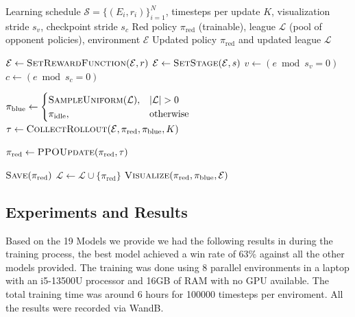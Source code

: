 \documentclass[conf]{new-aiaa}
\begin{document}
\begin{algorithm}[t]
\caption{League-based self-play training with curriculum over reward functions and spawn stages}
\label{alg:league_selfplay_curriculum}
\begin{algorithmic}[1]
\Require Learning schedule $\mathcal{S}=\{(E_i, r_i)\}_{i=1}^{N}$, timesteps per update $K$, visualization stride $s_v$, checkpoint stride $s_c$
\Require Red policy $\pi_{\text{red}}$ (trainable), league $\mathcal{L}$ (pool of opponent policies), environment $\mathcal{E}$
\Ensure Updated policy $\pi_{\text{red}}$ and updated league $\mathcal{L}$

 
    \State $\mathcal{E} \leftarrow \textsc{SetRewardFunction}(\mathcal{E}, r)$
     
        \State $\mathcal{E} \leftarrow \textsc{SetStage}(\mathcal{E}, s)$
            \State $v \gets (e \bmod s_v = 0)$ 
            \State $c \gets (e \bmod s_c = 0)$ 

            \State $\pi_{\text{blue}} \gets 
            \begin{cases}
                \textsc{SampleUniform}(\mathcal{L}), & |\mathcal{L}|>0\\
                \pi_{\text{idle}}, & \text{otherwise}
            \end{cases}$
            \State $\tau \gets \textsc{CollectRollout}(\mathcal{E}, \pi_{\text{red}}, \pi_{\text{blue}}, K)$

            \State $\pi_{\text{red}} \gets \textsc{PPOUpdate}(\pi_{\text{red}}, \tau)$

                \State $\textsc{Save}(\pi_{\text{red}})$
                \State $\mathcal{L} \gets \mathcal{L} \cup \{\pi_{\text{red}}\}$ 
            \EndIf
                \State $\textsc{Visualize}(\pi_{\text{red}}, \pi_{\text{blue}}, \mathcal{E})$
            \EndIf
        \EndFor
    \EndFor
\EndFor
\end{algorithmic}
\end{algorithm}

\subsection{Experiments and Results}
Based on the 19 Models we provide we had the following results in during the training process, the best model achieved a win rate of 63\% against all the other models provided. The training was done using 8 parallel environments in a laptop with an i5-13500U processor and 16GB of RAM with no GPU available. The total training time was around 6 hours for 100000 timesteps per enviroment. All the results were recorded via WandB.
\end{document}

